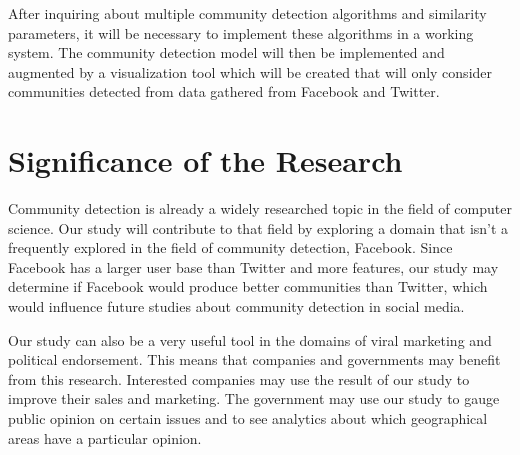 After inquiring about multiple community detection algorithms and similarity parameters, it will be necessary to implement these algorithms in a working system. The community detection model will then be implemented and augmented by a visualization tool which will be created that will only consider communities detected from data gathered from Facebook and Twitter.

\section{Significance of the Research}
\label{sec:significance}

Community detection is already a widely researched topic in the field of computer science. Our study will contribute to that field by exploring a domain that isn't a frequently explored in the field of community detection, Facebook. Since Facebook has a larger user base than Twitter and more features, our study may determine if Facebook would produce better communities than Twitter, which would influence future studies about community detection in social media.

Our study can also be a very useful tool in the domains of viral marketing and political endorsement. This means that companies and governments may benefit from this research. Interested companies may use the result of our study to improve their sales and marketing. The government may use our study to gauge public opinion on certain issues and to see analytics about which geographical areas have a particular opinion. 




